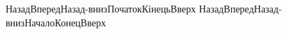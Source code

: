 
\ifx\languagename\undefined
\else
		{
		{Назад}{Вперед}{Назад-вниз}{Початок}{Кінець}{Вверх}
		}{}
		{
		{Назад}{Вперед}{Назад-вниз}{Начало}{Конец}{Вверх}
		}{}
\fi

